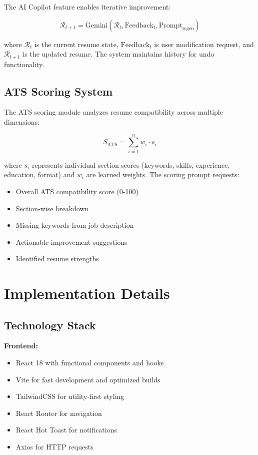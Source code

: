 \documentclass[conference]{IEEEtran}
\begin{document}
The AI Copilot feature enables iterative improvement:

\begin{equation}
\mathcal{R}_{t+1} = \text{Gemini}(\mathcal{R}_t, \text{Feedback}_t, \text{Prompt}_{\text{regen}})
\label{eq:regeneration}
\end{equation}

where $\mathcal{R}_t$ is the current resume state, $\text{Feedback}_t$ is user modification request, and $\mathcal{R}_{t+1}$ is the updated resume. The system maintains history for undo functionality.

\subsection{ATS Scoring System}

The ATS scoring module analyzes resume compatibility across multiple dimensions:

\begin{equation}
S_{\text{ATS}} = \sum_{i=1}^{n} w_i \cdot s_i
\label{eq:ats_score}
\end{equation}

where $s_i$ represents individual section scores (keywords, skills, experience, education, format) and $w_i$ are learned weights. The scoring prompt requests:

\begin{itemize}
    \item Overall ATS compatibility score (0-100)
    \item Section-wise breakdown
    \item Missing keywords from job description
    \item Actionable improvement suggestions
    \item Identified resume strengths
\end{itemize}

\section{Implementation Details}

\subsection{Technology Stack}

\textbf{Frontend:}
\begin{itemize}
    \item React 18 with functional components and hooks
    \item Vite for fast development and optimized builds
    \item TailwindCSS for utility-first styling
    \item React Router for navigation
    \item React Hot Toast for notifications
    \item Axios for HTTP requests
\end{itemize}
\end{document}
